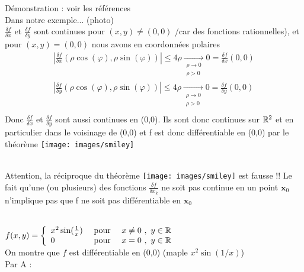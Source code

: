 \documentclass[12pt,a4paper]{article}
\begin{document}
\begin{enumerate}[label=\Alph*.]
\begin{boite}
			\end{boite}
			Démonstration : voir les références\\
			Dans notre exemple... (photo)\\
			$\frac{\delta f}{\delta x}$ et $\frac{\delta f}{\delta y}$ sont continues pour $(x,y) \neq (0,0)$ /car des fonctions rationnelles), et pour $(x,y) = (0,0)$ nous avons en coordonnées polaires 
			\begin{align*}
				|\frac{\delta f}{\delta x} (\rho \cos(\varphi),\rho \sin(\varphi))| \leq 4\rho \underset{\substack{\rho \to 0 \\ \rho > 0}}{\rightarrow} 0 = \frac{\delta f}{\delta x}(0,0)\\
				\left|\frac{\delta f}{\delta y} (\rho \cos(\varphi),\rho \sin(\varphi))\right| \leq 4\rho \underset{\substack{\rho \to 0 \\ \rho > 0}}{\rightarrow} 0 = \frac{\delta f}{\delta y}(0,0)\\
			\end{align*}
			Donc $\frac{\delta f}{ \delta x}$ et $\frac{\delta f}{\delta y}$ sont aussi continues en (0,0). Ils sont donc continues sur $\mathbb{R}^2$ et en particulier dans le voisinage de (0,0) et f est donc différentiable en (0,0) par le théorème \texttt{[image: images/smiley]}
			\begin{boite}
				\\
				Attention, la réciproque du théorème \texttt{[image: images/smiley]} est fausse !! Le fait qu'une (ou plusieurs) des fonctions $\frac{\delta f}{\delta x_k}$ ne soit pas continue en un point $\textbf{x}_0$ n'implique pas que f ne soit pas différentiable en $\textbf{x}_0$
			\end{boite}
\end{enumerate}
\\
$f(x,y) = \left\{\begin{array}{lll}
x^2\sin(\frac{1}{x}) & \mbox{ pour } & x\neq 0\ ,\ y\in\mathbb{R}\\
0 & \mbox{ pour } & x=0\ , \ y\in \mathbb{R}
\end{array}\right.$\\
On montre que $f$ est différentiable en (0,0) (maple $x^2\sin(1/x)$)\\
Par A :\\
\end{document}
